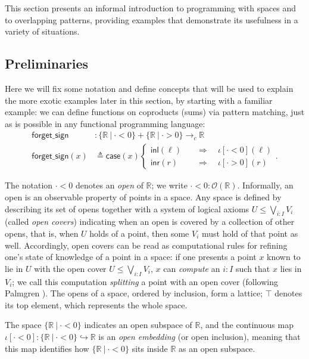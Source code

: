\documentclass[conference]{IEEEtran}
\newcommand{\hookto}{\hookrightarrow}
\newcommand{\cto}{\to_c}
\newcommand{\R}{\mathbb{R}}
\newcommand{\suchthat}{\ |\ }
\newcommand{\Open}[1]{\mathcal{O}({#1})}
\newcommand{\oinclf}[1]{\iota[{#1}]}
\newcommand{\oincl}[2]{\oinclf{#1} \left({#2}\right)}
\newcommand{\Branch}{\Rightarrow}
\begin{document}
This section presents an informal introduction to programming with spaces and to overlapping patterns, providing examples that demonstrate its usefulness in a variety of situations.

\subsection{Preliminaries}

Here we will fix some notation and define concepts that will be used to explain the more exotic examples later in this section, by starting with a familiar example: we can define functions on coproducts (sums) via pattern matching, just as is possible in any functional programming language:
\begin{align*}
\mathsf{forget\_sign} &: \{ \R \suchthat \cdot < 0 \} + \{ \R \suchthat \cdot > 0 \} \cto \R
\\ \mathsf{forget\_sign}(x) &\triangleq
  \mathsf{case}(x)
  \begin{cases}
  \mathsf{inl}(\ell) \quad &\Branch \quad \oincl{\cdot < 0}{\ell}
  \\ \mathsf{inr}(r) \quad &\Branch \quad \oincl{\cdot > 0}{r}
  \end{cases}.
\end{align*}

The notation $\cdot < 0$ denotes an \emph{open} of $\R$; we write $\cdot < 0 : \Open{\R}$. Informally, an open is an observable property of points in a space. Any space is defined by describing its set of opens together with a system of logical axioms $U \le \bigvee_{i : I} V_i$ (called \emph{open covers}) indicating when an open is covered by a collection of other opens, that is, when $U$ holds of a point, then some $V_i$ must hold of that point as well. Accordingly, open covers can be read as computational rules for refining one's state of knowledge of a point in a space: if one presents a point $x$ known to lie in $U$ with the open cover $U \le \bigvee_{i : I} V_i$, $x$ can \emph{compute} an $i : I$ such that $x$ lies in $V_i$; we call this computation \emph{splitting} a point with an open cover (following Palmgren \cite{palmgren2007}).
The opens of a space, ordered by inclusion, form a lattice; $\top$ denotes its top element, which represents the whole space.

The space $\{ \R \suchthat \cdot < 0 \}$ indicates an open subspace of $\R$, and the continuous map $\oinclf{\cdot < 0} : \{ \R \suchthat \cdot < 0 \} \hookto \R$ is an \emph{open embedding} (or open inclusion), meaning that this map identifies how $\{ \R \suchthat \cdot < 0 \}$ sits inside $\R$ as an open subspace.
\end{document}
